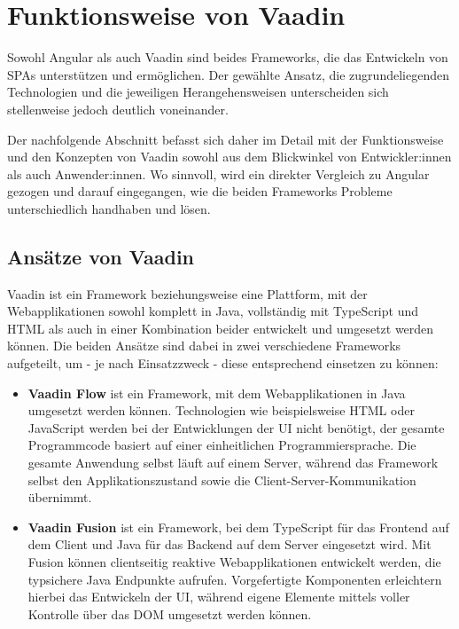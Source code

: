 \documentclass[a4paper,12pt,twoside]{scrreprt}
\begin{document}
\section{Funktionsweise von Vaadin}
\label{sec:funktionsweise-angular-vaadin}
Sowohl Angular als auch Vaadin sind beides Frameworks, die das Entwickeln von \aclp{SPA} unterstützen und ermöglichen. Der gewählte Ansatz, die zugrundeliegenden Technologien und die jeweiligen Herangehensweisen unterscheiden sich stellenweise jedoch deutlich voneinander.

Der nachfolgende Abschnitt befasst sich daher im Detail mit der Funktionsweise und den Konzepten von Vaadin sowohl aus dem Blickwinkel von Entwickler:innen als auch Anwender:innen. Wo sinnvoll, wird ein direkter Vergleich zu Angular gezogen und darauf eingegangen, wie die beiden Frameworks Probleme unterschiedlich handhaben und lösen.

\subsection{Ansätze von Vaadin}
\label{sub-sec:vaadin-ansaetze}
Vaadin ist ein Framework beziehungsweise eine Plattform, mit der Webapplikationen sowohl komplett in Java, vollständig mit TypeScript und HTML als auch in einer Kombination beider entwickelt und umgesetzt werden können. Die beiden Ansätze sind dabei in zwei verschiedene Frameworks aufgeteilt, um - je nach Einsatzzweck - diese entsprechend einsetzen zu können:

\begin{itemize}
    \item \textbf{Vaadin Flow} ist ein Framework, mit dem Webapplikationen in Java umgesetzt werden können. Technologien wie beispielsweise HTML oder JavaScript werden bei der Entwicklungen der \acs{UI} nicht benötigt, der gesamte Programmcode basiert auf einer einheitlichen Programmiersprache. Die gesamte Anwendung selbst läuft auf einem Server, während das Framework selbst den Applikationszustand sowie die Client-Server-Kommunikation übernimmt.  \parencite[][]{vaadin_ltd_vaadin_2021}
    \item \textbf{Vaadin Fusion} ist ein Framework, bei dem TypeScript für das Frontend auf dem Client und Java für das Backend auf dem Server eingesetzt wird. Mit Fusion können clientseitig reaktive Webapplikationen entwickelt werden, die typsichere Java Endpunkte aufrufen. Vorgefertigte Komponenten erleichtern hierbei das Entwickeln der \acs{UI}, während eigene Elemente mittels voller Kontrolle über das \acs{DOM} umgesetzt werden können. \parencite[][]{vaadin_ltd_vaadin_2021-1}
\end{itemize}
\end{document}
